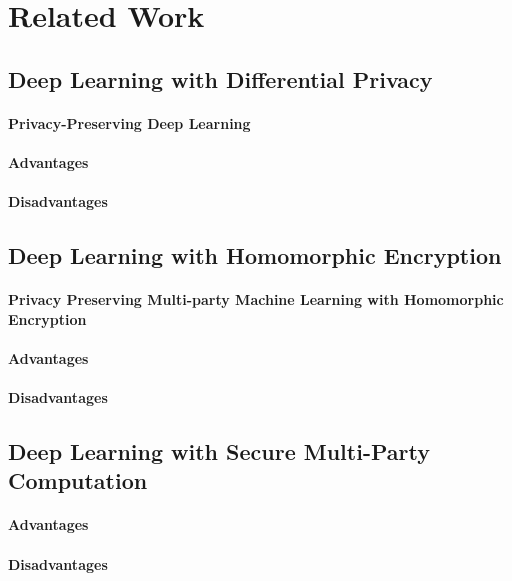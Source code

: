 \thispagestyle{myheadings}

\graphicspath{{2_Body/Figures/}}

\section{Related Work}

\subsection{Deep Learning with Differential Privacy}
\paragraph{Privacy-Preserving Deep Learning}
\paragraph{Advantages}
\paragraph{Disadvantages}

\subsection{Deep Learning with Homomorphic Encryption}
\paragraph{Privacy Preserving Multi-party Machine Learning with Homomorphic Encryption}
\paragraph{Advantages}
\paragraph{Disadvantages}

\subsection{Deep Learning with Secure Multi-Party Computation}
\paragraph{Advantages}
\paragraph{Disadvantages}